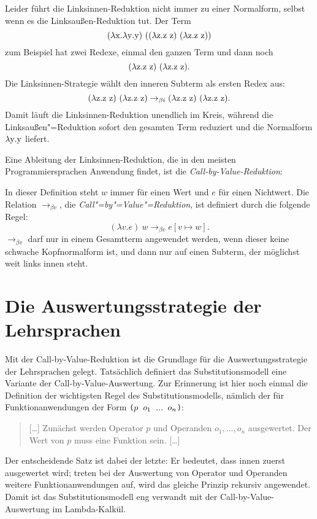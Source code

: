 %
Leider führt die Linksinnen-Reduktion nicht immer zu einer Normalform,
selbst wenn es die Linksaußen-Reduktion tut.  Der Term
\[ (\lambda \mathrm x.\lambda \mathrm y.\mathrm y)~((\lambda \mathrm z.\mathrm z~\mathrm z)~(\lambda \mathrm z.\mathrm z~\mathrm z)) \]
zum Beispiel hat zwei Redexe, einmal den ganzen Term und dann noch
\[(\lambda \mathrm z.\mathrm z~\mathrm z)~(\lambda \mathrm z.\mathrm z~\mathrm z).\]  Die Linksinnen-Strategie wählt
den inneren Subterm als ersten Redex aus:
%
\begin{displaymath}
  (\lambda \mathrm z.\mathrm z~\mathrm z)~(\lambda \mathrm z.\mathrm z~\mathrm z)
\rightarrow_{\beta i}
  (\lambda \mathrm z.\mathrm z~\mathrm z)~(\lambda \mathrm z.\mathrm z~\mathrm z).
\end{displaymath}
%
Damit läuft die Linksinnen-Reduktion unendlich im Kreis, während
die Linksaußen"=Reduktion sofort den gesamten Term reduziert und die
Normalform $\lambda \mathrm y.\mathrm y$ liefert.

Eine Ableitung der Linksinnen-Reduktion, die in den meisten
Programmiersprachen Anwendung findet, ist die
\textit{Call-by-Value-Reduktion}:
%
\begin{definition}\label{def:call-by-value}
  In dieser Definition steht $w$ immer für einen Wert und $e$ für
  einen Nichtwert.  Die Relation $\rightarrow_{\beta v}$, die
  \textit{Call"=by"=Value"=Reduktion}, ist definiert durch die
  folgende Regel:
  \begin{displaymath}
    (\lambda v.e)~w \rightarrow_{\beta v} e[v \mapsto w].
  \end{displaymath}
  $\rightarrow_{\beta v}$ darf nur in einem Gesamtterm angewendet
  werden, wenn dieser keine schwache Kopfnormalform ist,
  und dann nur auf einen Subterm, der möglichst weit links innen steht.
\end{definition}

\section{Die Auswertungsstrategie der Lehrsprachen}
\label{sec:scheme-auswertung}

Mit der Call-by-Value-Reduktion ist die Grundlage für die
Auswertungsstrategie der Lehrsprachen gelegt.  Tatsächlich definiert das
Substitutionsmodell eine Variante der
Call-by-Value-Auswertung.  Zur Erinnerung ist hier noch einmal die
Definition der wichtigsten Regel des Substitutionsmodells, nämlich der für
Funktionanwendungen der Form \texttt{(\(p\) \(o\sb{1}\) \(\ldots\) \(o\sb{n}\))}:
%
\begin{quote}
  [\ldots] Zunächst werden Operator $p$ und Operanden $o_1, \ldots, o_n$
  ausgewertet.  Der Wert von $p$ muss eine Funktion sein. [\ldots]
\end{quote}
%
Der entscheidende Satz ist dabei der letzte:
Er bedeutet, dass innen zuerst ausgewertet wird;
treten bei der Auswertung von Operator und Operanden weitere
Funktionanwendungen auf, wird das gleiche Prinzip rekursiv angewendet.
Damit ist das Substitutionsmodell eng verwandt mit der
Call-by-Value-Auswertung im Lambda-Kalkül.

